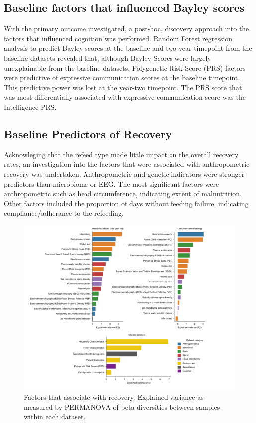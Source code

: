 \documentclass{article}
\begin{document}
\subsection*{Baseline factors that influenced Bayley scores}
With the primary outcome investigated, a post-hoc, discovery approach into the factors that influenced cognition was performed.
Random Forest regression analysis to predict Bayley scores at the baseline and two-year timepoint from the baseline datasets revealed that, although Bayley Scores were largely unexplainable from the baseline datasets, Polygenetic Risk Score (PRS) factors were predictive of expressive communication scores at the baseline timepoint.
This predictive power was lost at the year-two timepoint.
The PRS score that was most differentially associated with expressive communication score was the Intelligence PRS.

\subsection*{Baseline Predictors of Recovery}
Acknowleging that the refeed type made little impact on the overall recovery rates, an investigation into the factors that were associated with anthropometric recovery was undertaken.
Anthropometric and genetic indicators were stronger predictors than microbiome or EEG.
The most significant factors were anthropometric such as head circumference, indicating extent of malnutrition.
Other factors included the proportion of days without feeding failure, indicating compliance/adherance to the refeeding.
\begin{figure}[H]
\centering
\includegraphics[scale=0.8]{../../figures/ev.pdf}
	\caption[Factors that associate with recovery.]{
		Factors that associate with recovery.
		Explained variance as measured by PERMANOVA of beta diversities between samples within each dataset.
	}
\label{Figure3}
\end{figure}
\end{document}
